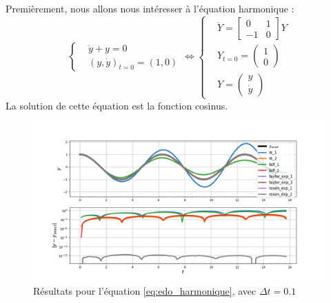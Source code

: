         \paragraph{}
        Premièrement, nous allons nous intéresser à l'équation harmonique :
        \begin{equation}
            \left\{
            \begin{aligned}
                &\ddot{y} + y = 0 \\
                &\left(y, \dot{y}\right)_{t = 0} = \left(1, 0\right)
            \end{aligned}
            \right.
            \Longleftrightarrow
            \left\{
            \begin{aligned}
                &\dot{Y} = \begin{bmatrix}0 & 1\\-1 & 0\end{bmatrix}Y \\
                &Y_{t = 0} = \begin{pmatrix}1\\0\end{pmatrix}\\
                &Y = \begin{pmatrix}y\\\dot{y}\end{pmatrix}
            \end{aligned}
            \right.
            \label{eq:edo_harmonique}
        \end{equation}
        La solution de cette équation est la fonction cosinus.
        \begin{figure}[h!]
            \centering
            \includegraphics[width=\textwidth]{images/resultats/edo_sine.png}
            \caption{Résultats pour l'équation \ref{eq:edo_harmonique}, avec $\Delta t = 0.1$}
            \label{fig:edo_harmonique}
        \end{figure}

